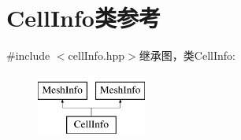 \hypertarget{classCellInfo}{
\section{CellInfo类参考}
\label{classCellInfo}
}


{\ttfamily \#include $<$cellInfo.hpp$>$}继承图，类CellInfo:\begin{figure}[H]
\begin{center}
\leavevmode
\includegraphics[height=2cm]{classCellInfo}
\end{center}
\end{figure}
